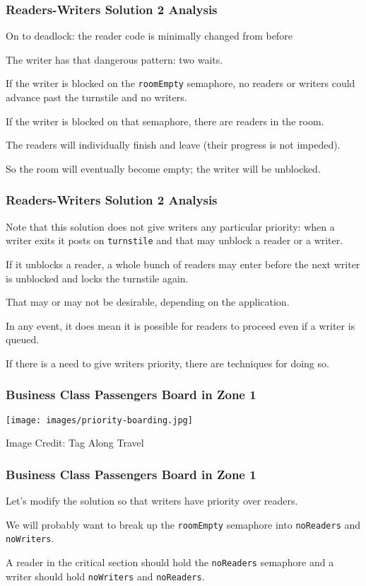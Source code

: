 \begin{frame}
	\frametitle{Readers-Writers Solution 2 Analysis}

	On to deadlock: the reader code is minimally changed from before

	The writer has that dangerous pattern: two waits.

	If the writer is blocked on the \texttt{roomEmpty} semaphore, no readers or writers could advance past the turnstile and no writers.

	If the writer is blocked on that semaphore, there are readers in the room.

	The readers will individually finish and leave (their progress is not impeded).

	So the room will eventually become empty; the writer will be unblocked.


\end{frame}

\begin{frame}
	\frametitle{Readers-Writers Solution 2 Analysis}

	Note that this solution does not give writers any particular priority: when a writer exits it posts on \texttt{turnstile} and that may unblock a reader or a writer.

	If it unblocks a reader, a whole bunch of readers may enter before the next writer is unblocked and locks the turnstile again.

	That may or may not be desirable, depending on the application.

	In any event, it does mean it is possible for readers to proceed even if a writer is queued.

	If there is a need to give writers priority, there are techniques for doing so.
\end{frame}


\begin{frame}
	\frametitle{Business Class Passengers Board in Zone 1}

	\begin{center}
		\texttt{[image: images/priority-boarding.jpg]}
	\end{center}
	{\footnotesize \hfill Image Credit: Tag Along Travel}
\end{frame}


\begin{frame}
	\frametitle{Business Class Passengers Board in Zone 1}

	Let's modify the solution so that writers have priority over readers.

	We will probably want to break up the \texttt{roomEmpty} semaphore into \texttt{noReaders} and \texttt{noWriters}.

	A reader in the critical section should hold the \texttt{noReaders} semaphore and a writer should hold \texttt{noWriters} and \texttt{noReaders}.

\end{frame}


